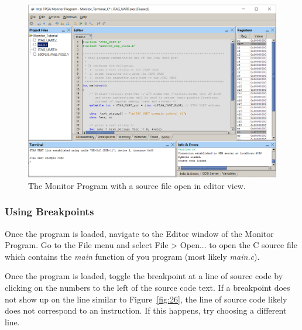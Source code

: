 \documentclass[11pt, twoside, pdftex]{article}
\begin{document}
\begin{figure}[h]
   \begin{center}
      \includegraphics[scale=0.5]{screenshots/figure25.png}
   \end{center}
   \caption{The Monitor Program with a source file open in editor view.}
	 \label{fig:25}
\end{figure}

\subsubsection{Using Breakpoints}
Once the program is loaded, navigate to the {\sf Editor} window of the Monitor Program.
Go to the File menu and select {\sf File > Open...} to open the C source file which contains the {\it main} 
function of you program (most likely {\it main.c}).

Once the program is loaded, toggle the breakpoint at a line of source code by clicking on the numbers to the 
left of the source code text. If a breakpoint does not show up on the line similar to Figure~\ref{fig:26}, the line of source code 
likely does not correspond to an instruction. If this happens, try choosing a different line.
\end{document}
